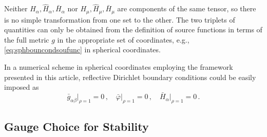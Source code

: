 \documentclass[a4paper,11pt]{article}
\numberwithin{equation}{section}
\begin{document}
Neither $H_\alpha,\hat{H}_\alpha,\bar{H}_\alpha$ nor $H_\mu,\hat{H}_\mu,\bar{H}_\mu$ are components of the same tensor, so there is no simple transformation from one set to the other. The two triplets of quantities can only be obtained from the definition of source functions in terms of the full metric $g$ in the appropriate set of coordinates, e.g.,\eqref{eq:sphbouncondsoufunc} in spherical coordinates.

In a numerical scheme in spherical coordinates employing the framework presented in this article, reflective Dirichlet boundary conditions could be easily imposed as
\begin{equation}
\label{eq:dirbc_sphcoords}
 \bar{g}_{\alpha\beta}\big|_{\rho=1}=0\,,\quad \bar{\varphi}\big|_{\rho=1}=0\,,\quad \bar{H}_\alpha\big|_{\rho=1}=0\,.
 \end{equation}

\subsection{Gauge Choice for Stability}\label{sec:gau_choice_sphcoords}
\end{document}
